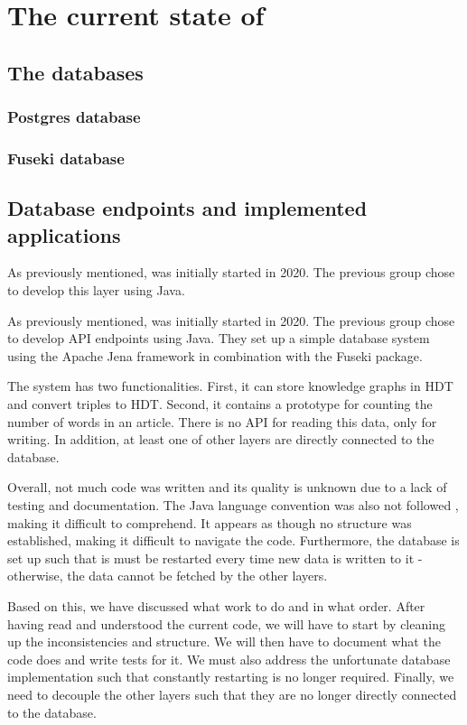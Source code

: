 \section{The current state of \knox{}}


\subsection{The \knox{} databases}
\subsubsection*{Postgres database}
\subsubsection*{Fuseki database}
\subsection{Database endpoints and implemented applications}

As previously mentioned, \knox{} was initially started in 2020.
The previous group chose to develop this layer using Java.

As previously mentioned, \knox{} was initially started in 2020.
The previous group chose to develop API endpoints using Java.
They set up a simple database system using the Apache Jena framework in combination with the Fuseki package.

The system has two functionalities. 
First, it can store knowledge graphs in HDT and convert triples to HDT.
Second, it contains a prototype for counting the number of words in an article.
There is no API for reading this data, only for writing. 
In addition, at least one of other layers are directly connected to the database.

Overall, not much code was written and its quality is unknown due to a lack of testing and documentation.
The Java language convention was also not followed \cite{java_convention}, making it difficult to comprehend.
It appears as though no structure was established, making it difficult to navigate the code. 
Furthermore, the database is set up such that is must be restarted every time new data is written to it - otherwise, the data cannot be fetched by the other layers.

Based on this, we have discussed what work to do and in what order.
After having read and understood the current code, we will have to start by cleaning up the inconsistencies and structure.
We will then have to document what the code does and write tests for it.
We must also address the unfortunate database implementation such that constantly restarting is no longer required.
Finally, we need to decouple the other layers such that they are no longer directly connected to the database.

